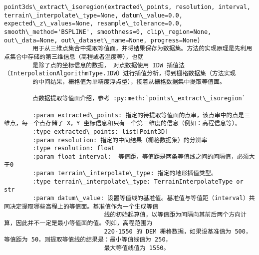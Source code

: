 \documentclass[11pt]{article}
\begin{document}
\begin{Verbatim}[commandchars=\\\{\}]
    point3ds\_extract\_isoregion(extracted\_points, resolution, interval, terrain\_interpolate\_type=None, datum\_value=0.0, expected\_z\_values=None, resample\_tolerance=0.0, smooth\_method='BSPLINE', smoothness=0, clip\_region=None, out\_data=None, out\_dataset\_name=None, progress=None)
        用于从三维点集合中提取等值面，并将结果保存为数据集。方法的实现原理是先利用点集合中存储的第三维信息（高程或者温度等），也就
        是除了点的坐标信息的数据， 对点数据使用 IDW 插值法（InterpolationAlgorithmType.IDW）进行插值分析，得到栅格数据集（方法实现
        的中间结果，栅格值为单精度浮点型），接着从栅格数据集中提取等值面。
        
        点数据提取等值面介绍，参考 :py:meth:`points\_extract\_isoregion`
        
        :param extracted\_points: 指定的待提取等值面的点串，该点串中的点是三维点，每一个点存储了 X，Y 坐标信息和只有一个第三维度的信息（例如：高程信息等）。
        :type extracted\_points: list[Point3D]
        :param resolution: 指定的中间结果（栅格数据集）的分辨率
        :type resolution: float
        :param float interval:  等值距，等值距是两条等值线之间的间隔值，必须大于0
        :param terrain\_interpolate\_type: 指定的地形插值类型。
        :type terrain\_interpolate\_type: TerrainInterpolateType or str
        :param datum\_value: 设置等值线的基准值。基准值与等值距（interval）共同决定提取哪些高程上的等值面。基准值作为一个生成等值
                            线的初始起算值，以等值距为间隔向其前后两个方向计算，因此并不一定是最小等值面的值。例如，高程范围为
                            220-1550 的 DEM 栅格数据，如果设基准值为 500，等值距为 50，则提取等值线的结果是：最小等值线值为 250，
                            最大等值线值为 1550。
        

\end{Verbatim}
\end{document}
